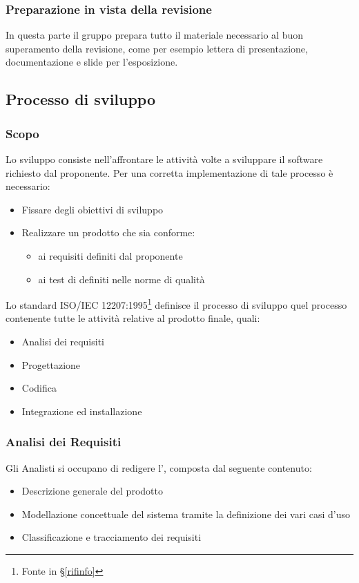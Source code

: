         \subsubsection{Preparazione in vista della revisione}
		In questa parte il gruppo prepara tutto il materiale necessario al buon superamento della revisione, come per esempio lettera di presentazione,
		documentazione e slide per l'esposizione.


    \subsection{Processo di sviluppo}\label{PP:Sviluppo}

		\subsubsection{Scopo}\label{PP:Sviluppo:Scopo}
		Lo sviluppo consiste nell'affrontare le attività volte a sviluppare il software richiesto dal proponente. Per una corretta implementazione di tale processo è
		necessario:
		\begin{itemize}
			\item Fissare degli obiettivi di sviluppo
			\item Realizzare un prodotto che sia conforme:
			\begin{itemize}
				\item ai requisiti definiti dal proponente
				\item ai test di definiti nelle norme di qualità
			\end{itemize}
		\end{itemize}
		Lo standard ISO/IEC 12207:1995\footnote{Fonte in \S\ref{rifinfo}} definisce il processo di sviluppo quel processo
		contenente tutte le attività relative al prodotto finale, quali:
		\begin{itemize} %
			\item Analisi dei requisiti
			\item Progettazione
			\item Codifica
			\item Integrazione ed installazione
		\end{itemize}


        \subsubsection{Analisi dei Requisiti}\label{PP:Sviluppo:AdR}
		Gli Analisti si occupano di redigere l', composta dal seguente contenuto:
		\begin{itemize}
			\item Descrizione generale del prodotto
			\item Modellazione concettuale del sistema tramite la definizione dei vari casi d'uso
			\item Classificazione e tracciamento dei requisiti
		\end{itemize}

